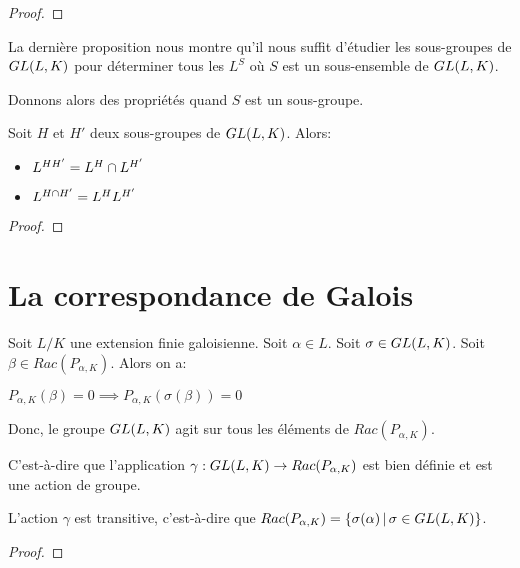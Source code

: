 \ifdefined\outputproof
\begin{proof}

\end{proof}
\fi

La dernière proposition nous montre qu'il nous suffit d'étudier les sous-groupes
de $GL(L, K)$ pour déterminer tous les $L^{S}$ où $S$ est un
sous-ensemble de $GL(L, K)$.

Donnons alors des propriétés quand $S$ est un sous-groupe.

\begin{proposition}
	Soit $H$ et $H'$ deux sous-groupes de $GL(L, K)$. Alors:
	\begin{itemize}
		\item $L^{HH'} = L^{H} \cap L^{H'}$
		\item $L^{H \cap H'} = L^{H} L^{H'}$
	\end{itemize}
\end{proposition}

\ifdefined\outputproof
\begin{proof}

\end{proof}
\fi

\section{La correspondance de Galois}

Soit $L/K$ une extension finie galoisienne. Soit $\alpha \in L$.
Soit $\sigma \in GL(L, K)$.
Soit $\beta \in Rac(P_{\alpha, K})$.
Alors on a:

$P_{\alpha, K}(\beta) = 0 \implies P_{\alpha, K}(\sigma(\beta)) = 0$

Donc, le groupe $GL(L, K)$ agit sur tous les éléments de
$Rac(P_{\alpha, K})$.

C'est-à-dire que l'application
$\gamma : GL(L, K) \rightarrow Rac(P_{\alpha, K})$ est bien définie
et est une action de groupe.

\begin{proposition}
	L'action $\gamma$ est transitive, c'est-à-dire que $Rac(P_{\alpha, K}) =
	\left\{\sigma(\alpha) \, | \, \sigma \in GL(L, K) \right\}$.
\end{proposition}

\ifdefined\outputproof
\begin{proof}

\end{proof}
\fi

